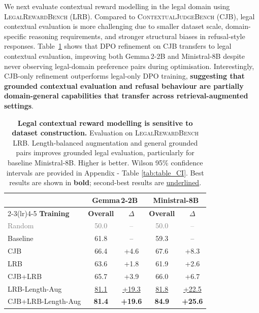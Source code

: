 \documentclass{article}
\theoremstyle{plain}
\theoremstyle{definition}
\theoremstyle{remark}
\begin{document}
We next evaluate contextual reward modelling in the legal domain using \textsc{LegalRewardBench} (LRB). Compared to \textsc{ContextualJudgeBench} (CJB), legal contextual evaluation is more challenging due to smaller dataset scale, domain-specific reasoning requirements, and stronger structural biases in refusal-style responses. Table~\ref{tab:lrbv2} shows that DPO refinement on CJB transfers to legal contextual evaluation, improving both Gemma\,2-2B and Ministral-8B despite never observing legal-domain preference pairs during optimisation. Interestingly, CJB-only refinement outperforms legal-only DPO training, \textbf{suggesting that grounded contextual evaluation and refusal behaviour are partially domain-general capabilities that transfer across retrieval-augmented settings}. 

\begin{table}[t!]
\centering
\caption{
\textbf{Legal contextual reward modelling is sensitive to dataset construction.}
Evaluation on \textsc{LegalRewardBench} LRB. Length-balanced augmentation and general grounded pairs improves grounded legal evaluation, particularly for baseline Ministral-8B. Higher is better. Wilson 95\% confidence intervals are provided in Appendix - Table \ref{tab:table_CI}. Best results are shown in \textbf{bold}; second-best results are \underline{underlined}. 
}
\label{tab:lrbv2}
\smallskip
\small
\setlength{\tabcolsep}{2.5pt}
\begin{tabular}{lcc|cc}
\toprule
& \multicolumn{2}{c}{\textbf{Gemma\,2-2B}}
& \multicolumn{2}{c}{\textbf{Ministral-8B}} \\
\cmidrule(lr){2-3}\cmidrule(lr){4-5}
\textbf{Training} & \textbf{Overall} & $\Delta$
& \textbf{Overall} & $\Delta$ \\
\midrule

\textcolor{gray}{Random}
& \textcolor{gray}{50.0}
& \textcolor{gray}{--}
& \textcolor{gray}{50.0}
& \textcolor{gray}{--} \\

\midrule
Baseline
& 61.8 & --
& 59.3 & -- \\

CJB
& 66.4 & +4.6
& 67.6 & +8.3 \\

LRB
& 63.6 & +1.8
& 61.9 & +2.6 \\

CJB+LRB
& 65.7 & +3.9
& 66.0 & +6.7 \\

\midrule
LRB-Length-Aug
& \underline{81.1} & \underline{+19.3}
& \underline{81.8} & \underline{+22.5} \\

\rowcolor{PrimaryGold!30}
CJB+LRB-Length-Aug
& \textbf{81.4} & \textbf{+19.6}
& \textbf{84.9} & \textbf{+25.6} \\

\bottomrule
\end{tabular}
\end{table}
\end{document}
